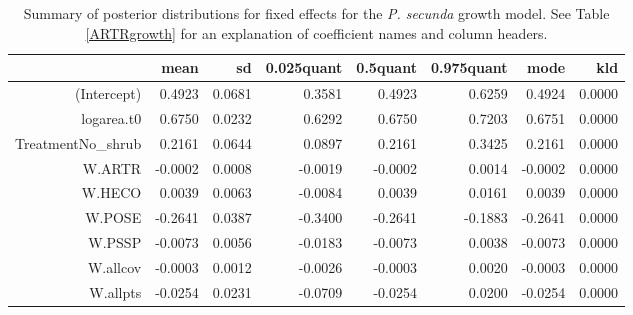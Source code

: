 \documentclass[11pt]{article}
\begin{document}
\begin{table}[ht]
\centering
\caption{Summary of posterior distributions for fixed effects for the \textit{P. secunda} growth model. See Table \ref{ARTRgrowth} for an explanation of coefficient names
and column headers.} 
\label{POSEgrowth}
\begin{tabular}{rrrrrrrr}
  \hline
 & mean & sd & 0.025quant & 0.5quant & 0.975quant & mode & kld \\ 
  \hline
(Intercept) & 0.4923 & 0.0681 & 0.3581 & 0.4923 & 0.6259 & 0.4924 & 0.0000 \\ 
  logarea.t0 & 0.6750 & 0.0232 & 0.6292 & 0.6750 & 0.7203 & 0.6751 & 0.0000 \\ 
  TreatmentNo\_shrub & 0.2161 & 0.0644 & 0.0897 & 0.2161 & 0.3425 & 0.2161 & 0.0000 \\ 
  W.ARTR & -0.0002 & 0.0008 & -0.0019 & -0.0002 & 0.0014 & -0.0002 & 0.0000 \\ 
  W.HECO & 0.0039 & 0.0063 & -0.0084 & 0.0039 & 0.0161 & 0.0039 & 0.0000 \\ 
  W.POSE & -0.2641 & 0.0387 & -0.3400 & -0.2641 & -0.1883 & -0.2641 & 0.0000 \\ 
  W.PSSP & -0.0073 & 0.0056 & -0.0183 & -0.0073 & 0.0038 & -0.0073 & 0.0000 \\ 
  W.allcov & -0.0003 & 0.0012 & -0.0026 & -0.0003 & 0.0020 & -0.0003 & 0.0000 \\ 
  W.allpts & -0.0254 & 0.0231 & -0.0709 & -0.0254 & 0.0200 & -0.0254 & 0.0000 \\ 
   \hline
\end{tabular}
\end{table}
\end{document}
